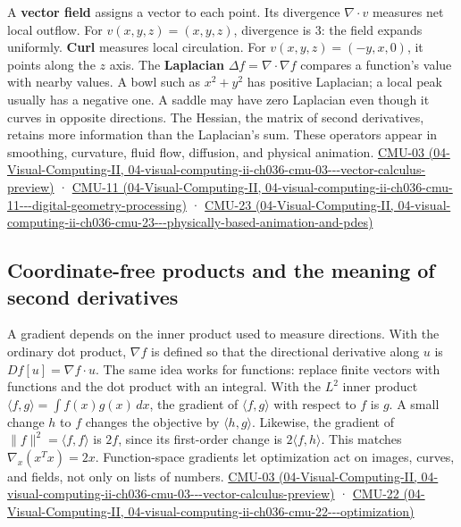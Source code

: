 A \textbf{vector field} assigns a vector to each point. Its divergence \(\nabla\cdot v\) measures net local outflow. For \(v(x,y,z)=(x,y,z)\), divergence is 3: the field expands uniformly. \textbf{Curl} measures local circulation. For \(v(x,y,z)=(-y,x,0)\), it points along the \(z\) axis. The \textbf{Laplacian} \(\Delta f=\nabla\cdot\nabla f\) compares a function's value with nearby values. A bowl such as \(x^2+y^2\) has positive Laplacian; a local peak usually has a negative one. A saddle may have zero Laplacian even though it curves in opposite directions. The Hessian, the matrix of second derivatives, retains more information than the Laplacian's sum. These operators appear in smoothing, curvature, fluid flow, diffusion, and physical animation. \href{../04-Visual-Computing-II/main.pdf\#nameddest=04-visual-computing-ii-ch036-cmu-03---vector-calculus-preview}{CMU-03 (04-Visual-Computing-II, 04-visual-computing-ii-ch036-cmu-03-\/-\/-vector-calculus-preview)} · \href{../04-Visual-Computing-II/main.pdf\#nameddest=04-visual-computing-ii-ch036-cmu-11---digital-geometry-processing}{CMU-11 (04-Visual-Computing-II, 04-visual-computing-ii-ch036-cmu-11-\/-\/-digital-geometry-processing)} · \href{../04-Visual-Computing-II/main.pdf\#nameddest=04-visual-computing-ii-ch036-cmu-23---physically-based-animation-and-pdes}{CMU-23 (04-Visual-Computing-II, 04-visual-computing-ii-ch036-cmu-23-\/-\/-physically-based-animation-and-pdes)}

\subsection{Coordinate-free products and the meaning of second derivatives}\label{03-visual-computing-i-ch001-coordinate-free-products-and-the-meaning-of-second-derivatives}

A gradient depends on the inner product used to measure directions. With the ordinary dot product, \(\nabla f\) is defined so that the directional derivative along \(u\) is \(Df[u]=\nabla f\cdot u\). The same idea works for functions: replace finite vectors with functions and the dot product with an integral. With the \(L^2\) inner product \(\langle f,g\rangle=\int f(x)g(x)\,dx\), the gradient of \(\langle f,g\rangle\) with respect to \(f\) is \(g\). A small change \(h\) to \(f\) changes the objective by \(\langle h,g\rangle\). Likewise, the gradient of \(\|f\|^2=\langle f,f\rangle\) is \(2f\), since its first-order change is \(2\langle f,h\rangle\). This matches \(\nabla_x(x^Tx)=2x\). Function-space gradients let optimization act on images, curves, and fields, not only on lists of numbers. \href{../04-Visual-Computing-II/main.pdf\#nameddest=04-visual-computing-ii-ch036-cmu-03---vector-calculus-preview}{CMU-03 (04-Visual-Computing-II, 04-visual-computing-ii-ch036-cmu-03-\/-\/-vector-calculus-preview)} · \href{../04-Visual-Computing-II/main.pdf\#nameddest=04-visual-computing-ii-ch036-cmu-22---optimization}{CMU-22 (04-Visual-Computing-II, 04-visual-computing-ii-ch036-cmu-22-\/-\/-optimization)}

